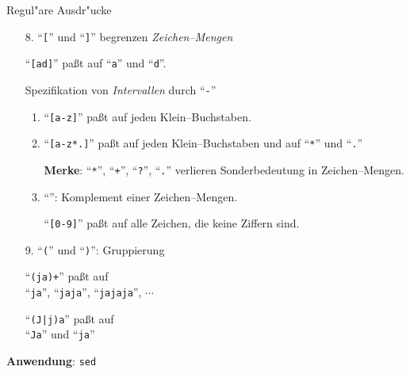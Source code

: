 
\begin{slide}{}
\normalsize
\begin{center}
Regul"are Ausdr"ucke
\end{center}

\footnotesize
\begin{enumerate}
\item[8.] ``\texttt{[}'' und ``\texttt{]}'' begrenzen \emph{Zeichen--Mengen}

     ``\texttt{[ad]}'' pa{\ss}t auf ``\texttt{a}'' und ``\texttt{d}''.
     \vspace*{0.3cm}

     Spezifikation von \emph{Intervallen} durch   ``\texttt{-}''
           \begin{enumerate}
           \item ``\texttt{[a-z]}'' pa{\ss}t auf jeden Klein--Buchstaben.
           \item ``\texttt{[a-z*.]}'' pa{\ss}t auf jeden Klein--Buchstaben und auf
                 ``\texttt{*}'' und ``\texttt{.}''

                 \textbf{Merke}: ``\texttt{*}'',  ``\texttt{+}'',  ``\texttt{?}'', ``\texttt{.}''
                 verlieren Sonderbedeutung in Zeichen--Mengen.
           \item ``\texttt{}'': Komplement einer Zeichen--Mengen.

                  ``\texttt{[0-9]}'' pa{\ss}t auf alle Zeichen, die keine
                 Ziffern sind.
           \end{enumerate}
\item[9.] ``\texttt{(}'' und ``\texttt{)}'': Gruppierung

      ``\texttt{(ja)+}'' pa{\ss}t auf \\[0.1cm]
      \hspace*{1.3cm} ``\texttt{ja}'', ``\texttt{jaja}'', ``\texttt{jajaja}'', $\cdots$

      ``\texttt{(J|j)a}'' pa{\ss}t auf \\[0.1cm]
      \hspace*{1.3cm} ``\texttt{Ja}'' und ``\texttt{ja}''
      
\end{enumerate}

\textbf{Anwendung}: \texttt{sed}


\end{slide}

